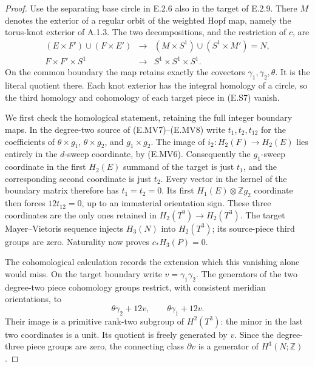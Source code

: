 \begin{proof}
Use the separating base circle in E.2.6 also in the target of
E.2.9. There $M$ denotes the exterior of a regular orbit of the
weighted Hopf map, namely the torus-knot exterior of A.1.3. The
two decompositions, and the restriction of $c$, are
\[
 \begin{array}{ccc}
 (E\times F')\cup(F\times E')&\longrightarrow&
                  (M\times S^1)\cup(S^1\times M')=N,\\
 F\times F'\times S^1&\longrightarrow&S^1\times S^1\times S^1.
 \end{array}
 \tag{E.S7}
\]
On the common boundary the map retains exactly the covectors
$\gamma_1,\gamma_2,\theta$. It is the literal quotient there.
Each knot exterior has the integral homology of a circle, so the
third homology and cohomology of each target piece in (E.S7) vanish.

We first check the homological statement, retaining the full
integer boundary maps. In the degree-two source of (E.MV7)--(E.MV8)
write $t_1,t_2,t_{12}$ for the coefficients of
$\theta\times g_1$, $\theta\times g_2$, and $g_1\times g_2$.
The image of $i_2:H_2(F)\to H_2(E)$ lies entirely in the
$d$-sweep coordinate, by (E.MV6). Consequently the $g_1$-sweep
coordinate in the first $H_2(E)$ summand of the target is just
$t_1$, and the corresponding second coordinate is just $t_2$.
Every vector in the kernel of the boundary matrix therefore has
$t_1=t_2=0$. Its first $H_1(E)\otimes\mathbb Zg_2$ coordinate
then forces $12t_{12}=0$, up to an immaterial orientation sign.
These three coordinates are the only ones retained in
$H_2(T^9)\to H_2(T^3)$. The target Mayer--Vietoris sequence
injects $H_3(N)$ into $H_2(T^3)$; its source-piece third groups
are zero. Naturality now proves $c_*H_3(P)=0$.

The cohomological calculation records the extension which this
vanishing alone would miss. On the target boundary write
$v=\gamma_1\gamma_2$. The generators of the two degree-two
piece cohomology groups restrict, with consistent meridian
orientations, to
\[
       \theta\gamma_2+12v,
       \qquad \theta\gamma_1+12v.
 \tag{E.S8}
\]
Their image is a primitive rank-two subgroup of $H^2(T^3)$:
the minor in the last two coordinates is a unit. Its quotient
is freely generated by $v$. Since the degree-three piece groups
are zero, the connecting class $\partial v$ is a generator of
$H^3(N;\mathbb Z)$.


\end{proof}
